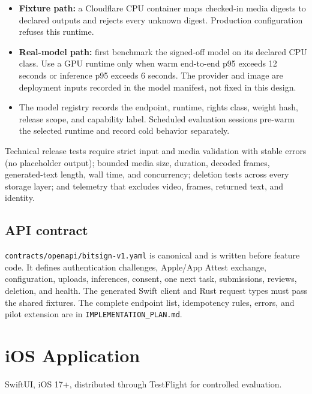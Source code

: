 \documentclass[11pt]{article}
\newcommand{\code}[1]{\texttt{#1}}
\begin{document}
\begin{itemize}[nosep]
  \item \textbf{Fixture path:} a Cloudflare CPU container maps checked-in media
        digests to declared outputs and rejects every unknown digest. Production
        configuration refuses this runtime.
  \item \textbf{Real-model path:} first benchmark the signed-off model on its
        declared CPU class. Use a GPU runtime only when warm end-to-end p95 exceeds
        12 seconds or inference p95 exceeds 6 seconds. The provider and image are
        deployment inputs recorded in the model manifest, not fixed in this design.
  \item The model registry records the endpoint, runtime, rights class, weight hash,
        release scope, and capability label. Scheduled evaluation sessions pre-warm
        the selected runtime and record cold behavior separately.
\end{itemize}

Technical release tests require strict input and media validation with stable errors
(no placeholder output); bounded media size, duration, decoded frames,
generated-text length, wall time, and concurrency; deletion tests across every
storage layer; and telemetry that excludes video, frames, returned text, and
identity.

\subsection{API contract}

\code{contracts/openapi/bitsign-v1.yaml} is canonical and is written before feature
code. It defines authentication challenges, Apple/App Attest exchange, configuration,
uploads, inferences, consent, one next task, submissions, reviews, deletion, and health.
The generated Swift client and Rust request types must pass the shared fixtures. The
complete endpoint list, idempotency rules, errors, and pilot extension are in
\code{IMPLEMENTATION\_PLAN.md}.

\section{iOS Application}

SwiftUI, iOS 17+, distributed through TestFlight for controlled evaluation.
\end{document}
